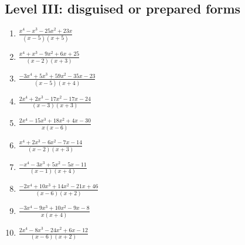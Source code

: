\documentclass[11pt,oneside]{book}
\begin{document}
\subsection*{Level III: disguised or prepared forms}
\begin{enumerate}[leftmargin=*,label=\textbf{\arabic*.},itemsep=0.65\baselineskip]
\item $\displaystyle \frac{x^{4} - x^{3} - 25 x^{2} + 23 x}{\left(x - 5\right) \left(x + 5\right)}$
\item $\displaystyle \frac{x^{4} + x^{3} - 9 x^{2} + 6 x + 25}{\left(x - 2\right) \left(x + 3\right)}$
\item $\displaystyle \frac{- 3 x^{4} + 5 x^{3} + 59 x^{2} - 35 x - 23}{\left(x - 5\right) \left(x + 4\right)}$
\item $\displaystyle \frac{2 x^{4} + 2 x^{3} - 17 x^{2} - 17 x - 24}{\left(x - 3\right) \left(x + 3\right)}$
\item $\displaystyle \frac{2 x^{4} - 15 x^{3} + 18 x^{2} + 4 x - 30}{x \left(x - 6\right)}$
\item $\displaystyle \frac{x^{4} + 2 x^{3} - 6 x^{2} - 7 x - 14}{\left(x - 2\right) \left(x + 3\right)}$
\item $\displaystyle \frac{- x^{4} - 3 x^{3} + 5 x^{2} - 5 x - 11}{\left(x - 1\right) \left(x + 4\right)}$
\item $\displaystyle \frac{- 2 x^{4} + 10 x^{3} + 14 x^{2} - 21 x + 46}{\left(x - 6\right) \left(x + 2\right)}$
\item $\displaystyle \frac{- 3 x^{4} - 9 x^{3} + 10 x^{2} - 9 x - 8}{x \left(x + 4\right)}$
\item $\displaystyle \frac{2 x^{4} - 8 x^{3} - 24 x^{2} + 6 x - 12}{\left(x - 6\right) \left(x + 2\right)}$
\end{enumerate}
\end{document}
